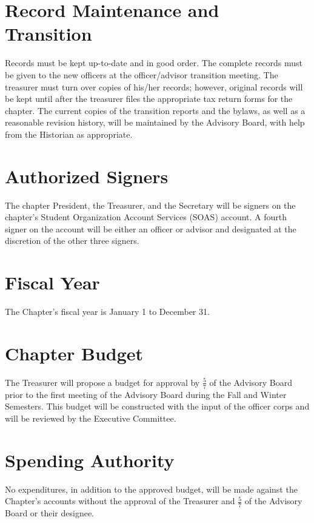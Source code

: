 \section{Record Maintenance and Transition} Records must be kept up-to-date and in good order. The complete records must be given  to the new officers at the officer/advisor transition meeting. The treasurer must turn over copies of his/her records; however, original records will be kept until after the treasurer files the appropriate tax return forms for the chapter. The current copies of the transition reports and the bylaws, as well as a reasonable revision history, will be maintained by the Advisory Board, with help from the Historian as appropriate.
\section{Authorized Signers} %
 The chapter President, the Treasurer, and the Secretary will be signers on the chapter's Student Organization Account Services (SOAS) account. A fourth signer on the account will be either an officer or advisor and designated at the discretion of the other three signers.  
\section{Fiscal Year} The Chapter's fiscal year is January 1 to December 31.

\section{Chapter Budget} The Treasurer will propose a budget for approval by $\frac{5}{7}$ of the Advisory Board prior to the first meeting of the Advisory Board during the Fall and Winter Semesters. This budget will be constructed with the input of the officer corps and will be reviewed by the Executive Committee.  %
\section{Spending Authority} No expenditures, in addition to the approved budget, will be made against the Chapter's accounts without the approval of the Treasurer and $\frac{5}{7}$ of the Advisory Board or their designee.
